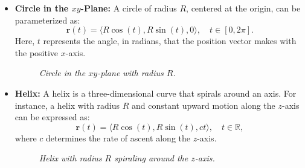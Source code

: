 \begin{itemize}
    \item \textbf{Circle in the \( xy \)-Plane:} A circle of radius \( R \), centered at the origin, can be parameterized as:
    \[
    \mathbf{r}(t) = \langle R \cos(t), R \sin(t), 0 \rangle, \quad t \in [0, 2\pi].
    \]
    Here, \( t \) represents the angle, in radians, that the position vector makes with the positive \( x \)-axis.

    \begin{figure}[H]
        \centering
        \caption{\textit{Circle in the \( xy \)-plane with radius \( R \).}}
        \label{fig:circle_param}
    \end{figure}

    \item \textbf{Helix:} A helix is a three-dimensional curve that spirals around an axis. For instance, a helix with radius \( R \) and constant upward motion along the \( z \)-axis can be expressed as:
    \[
    \mathbf{r}(t) = \langle R \cos(t), R \sin(t), ct \rangle, \quad t \in \mathbb{R},
    \]
    where \( c \) determines the rate of ascent along the \( z \)-axis.

    \begin{figure}[H]
        \centering
        \caption{\textit{Helix with radius \( R \) spiraling around the \( z \)-axis.}}
        \label{fig:helix_param}
    \end{figure}


\end{itemize}

